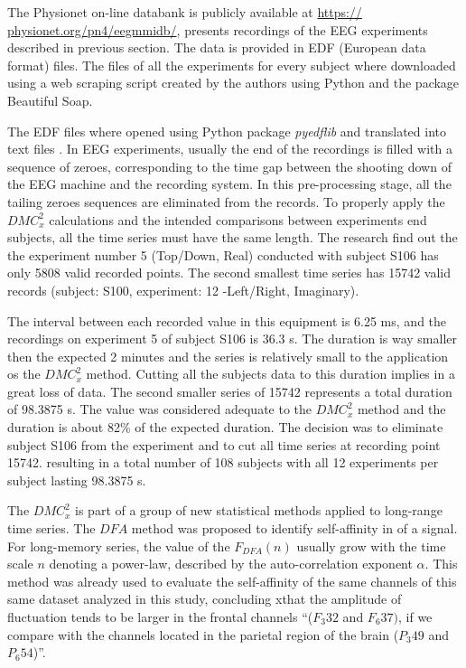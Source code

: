 \documentclass[10pt,letterpaper]{article}
\newcommand{\dmc}{\(DMC_x^2\) }
\begin{document}
The Physionet on-line databank is publicly available at \url{https:// physionet.org/pn4/eegmmidb/}, presents recordings of the EEG experiments described in previous section. The data is  provided in EDF (European data format) files. The files of all the experiments for every subject where downloaded using a web scraping script created by the authors using Python and the package Beautiful Soap.

The EDF files where opened using Python package \emph{pyedflib} and translated into text files . In EEG experiments, usually the end of the recordings is filled with a sequence of zeroes, corresponding to the time gap between the shooting down of the EEG machine and the recording system. In this pre-processing stage, all the tailing zeroes sequences are eliminated from the records. To properly apply the \dmc calculations and the intended comparisons between experiments end subjects, all the time series must have the same length. The research find out the the	experiment number 5	(Top/Down, Real) conducted with subject S106 has only 5808 valid recorded points. The second smallest time series has 15742 valid records (subject: S100, experiment: 12	-Left/Right,	Imaginary).

The interval between each recorded value in this equipment is 6.25 ms, and the recordings on experiment 5 of subject S106 is 36.3 s. The duration is way smaller then the expected 2 minutes and the series is relatively small to the application os the \dmc method. Cutting all the subjects data to this duration implies in a great loss of data. The second smaller series of 15742 represents a total duration of 98.3875 s. The value was considered adequate to the \dmc method and the duration is about 82\% of the expected duration. The decision was to eliminate subject S106 from the experiment and to cut all time series at recording point 15742. resulting in a total number of 108 subjects with all 12 experiments per subject lasting 98.3875 s.


The \dmc is part of a group of new statistical methods applied to long-range time series. The \(DFA\) method \cite{Peng1994} was proposed to identify self-affinity in of a signal. For long-memory series, the value of the \(F_{DFA}(n)\) usually grow with the time scale \(n\) denoting a power-law, described by the auto-correlation exponent \(\alpha\). This method was already used to evaluate the self-affinity of the same channels of this same dataset analyzed in this study, concluding xthat the amplitude of fluctuation tends to be larger in the frontal channels ``(\(F_{3}32\) and \(F_{6}37)\), if we compare with the channels located in the parietal region of the brain (\(P_{3}49\) and \(P_{6}54\))''\cite{Zebende2017}.
\end{document}
